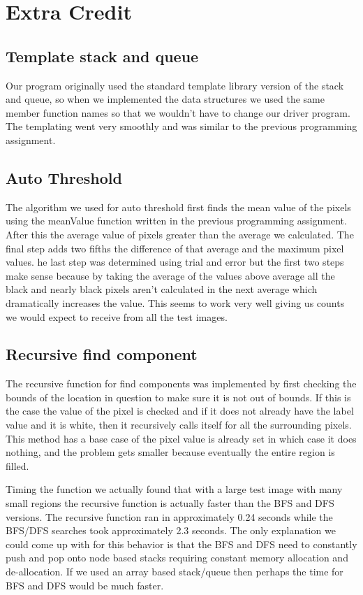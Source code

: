 \documentclass[pdftex, 11pt]{article}
\begin{document}
\section{Extra Credit}

	\subsection{Template stack and queue}

		Our program originally used the standard template library version of the stack and queue, so when we implemented
		the data structures we used the same member function names so that we wouldn't have to change our driver
		program.  The templating went very smoothly and was similar to the previous programming assignment.

	\subsection{Auto Threshold}
		
		The algorithm we used for auto threshold first finds the mean value of the pixels using the meanValue function
		written in the previous programming assignment.  After this the average value of pixels greater than the average
		we calculated.  The final step adds two fifths the difference of that average and the maximum pixel values.
		he last step was determined using trial and error but the first two steps make sense because by taking the
		average of the values above average all the black and nearly black pixels aren't calculated in the next average
		which dramatically increases the value.  This seems to work very well giving us counts we would expect to
		receive from all the test images.
	
	\subsection{Recursive find component}

		The recursive function for find components was implemented by first checking the bounds of the location in
		question to make sure it is not out of bounds.  If this is the case the value of the pixel is checked and if it
		does not already have the label value and it is white, then it recursively calls itself for all the surrounding
		pixels.  This method has a base case of the pixel value is already set in which case it does nothing, and the
		problem gets smaller because eventually the entire region is filled.

		Timing the function we actually found that with a large test image with many small regions the recursive
		function is actually faster than the BFS and DFS versions.  The recursive function ran in
		approximately 0.24 seconds while the BFS/DFS searches took approximately 2.3 seconds.  The only explanation we
		could come up with for this behavior is that the BFS and DFS need to constantly push and pop onto node based
		stacks requiring constant memory allocation and de-allocation.  If we used an array based stack/queue then
		perhaps the time for BFS and DFS would be much faster.
\end{document}
